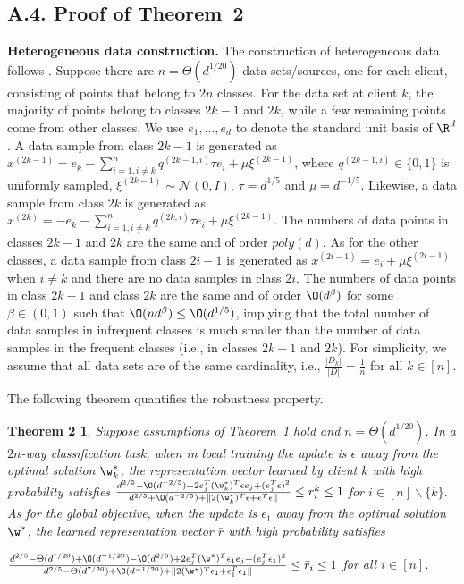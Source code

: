 \documentclass[a4paper,11pt]{article}
\begin{document}
    \subsection*{A.4. Proof of Theorem~2}
    {\textbf{Heterogeneous data construction. }}
The construction of heterogeneous data follows \cite{wang2022does}. Suppose there are $n = \Theta(d^{1/20})$ data sets/sources, one for each client, consisting of points that belong to $2n$ classes. For the data set at client $k$, the majority of points belong to classes $2k-1$ and $2k$, while a few remaining points come from other classes. We use $e_1, \dots, e_d$ to denote the standard unit basis of $\R^d$. A data sample from class $2k-1$ is generated as $x^{(2k-1)} = e_k - \sum_{i=1, i\neq k}^n q^{(2k-1, i)}\tau e_i + \mu \xi^{(2k-1)} $, where $q^{(2k-1, i)} \in \{0, 1 \} $ is uniformly sampled, $\xi^{(2k-1)} \sim \mathcal{N}(0, I)$, $\tau = d^{1/5}$ and $\mu = d^{-1/5}$. Likewise, a data sample from class $2k$ is generated as $x^{(2k)} = -e_k - \sum_{i=1, i\neq k}^n q^{(2k, i)}\tau e_i + \mu \xi^{(2k-1)} $. The numbers of data points in classes $2k-1$ and $2k$ are the same and of order $poly(d)$. As for the other classes, a data sample from class $2i-1$ is generated as $x^{(2i-1)} = e_i + \mu \xi^{(2i-1)}$ when $i \neq k$ and there are no data samples in class $2i$. The numbers of data points in class $2k-1$ and class $2k$ are the same and of order $\O(d^{\beta})$ for some $\beta \in (0, 1)$ such that $\O(nd^{\beta}) \leq \O(d^{1/5})$, implying that the total number of data samples in infrequent classes is much smaller than the number of data samples in the frequent classes (i.e., in classes $2k-1$ and $2k$). For simplicity, we assume that all data sets are of the same cardinality, i.e., $\frac{|D_k|}{|D|} = \frac{1}{n}$ for all $k \in [n]$.

The following theorem quantifies the robustness property.

\newtheorem*{theorem2}{Theorem 2}
\begin{theorem2}
Suppose assumptions of Theorem~1 hold and $n = \Theta(d^{1/20})$. In a $2n$-way classification task, when in local training the update is $\epsilon$ away from the optimal solution $\w_k^*$, the representation vector learned by client $k$ with high probability satisfies $ \frac{d^{2/5} - \O(d^{-2/5}) + 2e_j^T (\w_k^*)^T \epsilon e_j + (e_j^T \epsilon)^2}{d^{2/5} + \O(d^{-2/5}) + \|2(\w_k^*)^T \epsilon + \epsilon^T \epsilon  \|} \leq r_{i}^k \leq 1$ for $i \in [n]\backslash \{k \}$. As for the global objective, when the update is $\epsilon_1$ away from the optimal solution $\w^*$, the learned representation vector $\bar{r}$ with high probability satisfies 

$\frac{d^{2/5} - \Theta(d^{7/20}) + \O(d^{-1/20}) - \O(d^{2/5}) + 2e_j^T (\w^*)^T \epsilon_1 e_j + (e_j^T \epsilon_1)^2 }{d^{2/5} - \Theta(d^{7/20}) + \O(d^{-1/20}) + \|2(\w^*)^T \epsilon_1 + \epsilon_1^T \epsilon_1  \|} \leq \bar{r}_i \leq 1$ for all $i \in [n]$. 
\end{theorem2}
\end{document}

